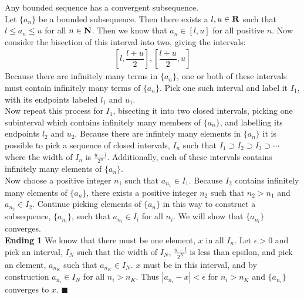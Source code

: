     \thm Any bounded sequence has a convergent subsequence.\\

    \pf Let $\{a_n\}$ be a bounded subsequence. Then there exists a $l,u \in \mathbf{R}$ such that 
    $l \leq a_n \leq u$ for all $n \in \mathbf{N}$. Then we know that $a_n \in [l,u]$ for all 
    positive $n$. Now consider the bisection of this interval into two, giving the intervals:\\
    \begin{align*}
      \left[l, \dfrac{l+u}{2}\right] , \left[\dfrac{l+u}{2},u\right]
    \end{align*}
    Because there are infinitely many terms in $\{a_n\}$, one or both of these intervals must 
    contain infinitely many terms of $\{a_n\}$. Pick one such interval and label it $I_1$, with 
    its endpoints labeled $l_1$ and $u_1$.\\

    Now repeat this process for $I_1$, bisecting it into two closed intervals, picking one 
    subinterval which contains infinitely many members of $\{a_n\}$, and labelling its endpoints
    $l_2$ and $u_2$. Because there are infintely many elements in $\{a_n\}$ it is possible to 
    pick a sequence of closed intervals, $I_n$ such that $I_1 \supset I_2 \supset I_3 \supset 
    \cdots$ where the width of $I_n$ is $\frac{u-l}{2^n}$. Additionally, each of these intervals
    contains infinitely many elements of $\{a_n\}$.\\

    Now choose a positive integer $n_1$ such that $a_{n_1} \in I_1$. Because $I_2$ contains 
    infinitely many elements of $\{a_n\}$, there exists a positive integer $n_2$ such that $n_2 
    > n_1$ and $a_{n_2} \in I_2$. Continue picking elements of $\{a_n\}$ in this way to construct
    a subsequence, $\{a_{n_i}\}$, such that $a_{n_i} \in I_i$ for all $n_i$. We will show that 
    $\{a_{n_i}\}$ converges.\\
    
    \textbf{Ending 1} We know that there must be one element, $x$ in all $I_n$. Let $\epsilon
    > 0$ and pick an interval, $I_N$ such that the width of $I_N$, $\frac{u - l}{2^N}$ is less
    than epsilon, and pick an element, $a_{n_K}$ such that $a_{n_K} \in I_N$. $x$ must be in this
    interval, and by construction $a_{n_i} \in I_N$ for all $n_i > n_K$. Thus $|a_{n_i} - x| < 
    \epsilon$ for $n_i > n_K$ and $\{a_{n_i}\}$ converges to $x$. $\blacksquare$\\

